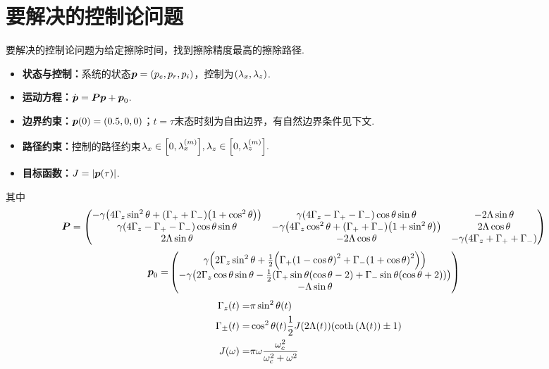\documentclass[UTF8]{article}
\numberwithin{equation}{section}
\begin{document}
    \section{要解决的控制论问题}\label{sec:control}
        要解决的控制论问题为给定擦除时间，找到擦除精度最高的擦除路径.
        \begin{itemize}
            \item \textbf{状态与控制：}系统的状态$\vb*{p}=\pqty{p_e,p_r,p_i}$，控制为$\pqty{\lambda_x,\lambda_z}$.
            \item \textbf{运动方程：}$\dot{\vb*{p}}=\vb*{P}\vb*{p}+\vb*{p}_0$.
            \item \textbf{边界约束：}$\vb*{p}\pqty{0}=\pqty{0.5,0,0}$；$t=\tau$末态时刻为自由边界，有自然边界条件见下文.
            \item \textbf{路径约束：}控制的路径约束$\lambda_x\in\bqty{0,\lambda_x^\pqty{m}},\lambda_z\in\bqty{0,\lambda_z^\pqty{m}}.$
            \item \textbf{目标函数：}$J=\abs{\vb*{p}\pqty{\tau}}$.
        \end{itemize}
        其中
        \begin{align}
            &\vb*{P}=\pmqty{
                -\gamma\pqty{4\Gamma_z\sin^2\theta+\pqty{\Gamma_++\Gamma_-}\pqty{1+\cos^2\theta}}&\gamma\pqty{4\Gamma_z-\Gamma_+-\Gamma_-}\cos\theta\sin\theta&-2\Lambda\sin\theta\\
                \gamma\pqty{4\Gamma_z-\Gamma_+-\Gamma_-}\cos\theta\sin\theta&-\gamma\pqty{4\Gamma_z\cos^2\theta+\pqty{\Gamma_++\Gamma_-}\pqty{1+\sin^2\theta}}&2\Lambda\cos\theta\\
                2\Lambda\sin\theta&-2\Lambda\cos\theta&-\gamma\pqty{4\Gamma_z+\Gamma_++\Gamma_-}
            }
        \end{align}
        \begin{align}
            \vb*{p}_0=&\pmqty{
                \gamma\pqty{2\Gamma_z\sin^2\theta+\frac{1}{2}\pqty{\Gamma_+\pqty{1-\cos\theta}^2+\Gamma_-\pqty{1+\cos\theta}^2}}\\
                -\gamma\pqty{2\Gamma_z\cos\theta\sin\theta-\frac{1}{2}\pqty{\Gamma_+\sin\theta\pqty{\cos\theta-2}+\Gamma_-\sin\theta\pqty{\cos\theta+2}}}\\
                -\Lambda\sin\theta
            }
        \end{align}
        \begin{align}
            \Gamma_z\pqty{t}=&\pi\sin^2\theta\pqty{t}\\
            \Gamma_\pm\pqty{t}=&\cos^2\theta\pqty{t}\frac{1}{2}J\pqty{2\Lambda\pqty{t}}\pqty{\coth\pqty{\Lambda\pqty{t}}\pm 1}\\
            J\pqty{\omega}=&\pi\omega\frac{\omega_c^2}{\omega_c^2+\omega^2}
        \end{align}
\end{document}
